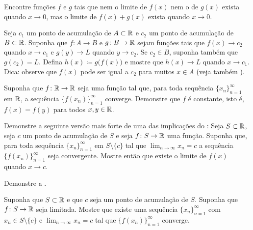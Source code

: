 \begin{exercise}
Encontre funções $f$ e $g$ tais que nem o limite de $f(x)$ nem o de $g(x)$ exista quando $x \to 0$, mas o limite de $f(x)+g(x)$ exista quando $x \to 0$.
\end{exercise}

\begin{exercise} \label{exercise:contlimitcomposition}
Seja $c_1$ um ponto de acumulação de $A \subset {\mathbb{R}}$ e $c_2$ um
ponto de acumulação de $B \subset {\mathbb{R}}$. Suponha que
$f \colon A \to B$ e $g \colon B \to {\mathbb{R}}$ sejam funções tais que
$f(x) \to c_2$ quando $x \to c_1$ e
$g(y) \to L$ quando $y \to c_2$. Se $c_2 \in B$, suponha também que $g(c_2) = L$.
Defina $h(x) \coloneqq g\bigl(f(x)\bigr)$ e mostre que
$h(x) \to L$ quando $x \to c_1$.
Dica: observe que $f(x)$ pode ser igual a $c_2$ para muitos $x \in A$
(veja também
).
\end{exercise}

\begin{exercise}
Suponha que $f \colon {\mathbb{R}} \to {\mathbb{R}}$ seja uma função tal que, para toda
sequência $\{x_n\}_{n=1}^\infty$ em ${\mathbb{R}}$, a sequência
$\bigl\{ f(x_n) \bigr\}_{n=1}^\infty$ converge. Demonstre que
$f$ é constante, isto é,
$f(x) = f(y)$ para todos $x,y \in {\mathbb{R}}$.
\end{exercise}

\begin{exercise} \label{exercise:seqflimitalt}
Demonstre a seguinte versão mais forte de uma das implicações do
:
Seja $S \subset {\mathbb{R}}$, seja $c$ um ponto de acumulação de $S$ e seja $f \colon S \to
{\mathbb{R}}$ uma função.
Suponha que, para toda sequência $\{x_n\}_{n=1}^\infty$ em $S \setminus \{c\}$ tal que
$\lim_{n\to\infty} x_n = c$ a sequência $\bigl\{ f(x_n) \bigr\}_{n=1}^\infty$ seja convergente.
Mostre então que existe o limite de $f(x)$ quando $x \to c$.
\end{exercise}

\begin{exercise}
Demonstre a .
\end{exercise}

\begin{exercise}
Suponha que $S \subset {\mathbb{R}}$ e que $c$ seja um ponto de acumulação de $S$.  Suponha que $f \colon
S \to {\mathbb{R}}$ seja limitada.  Mostre que existe uma sequência
$\{ x_n \}_{n=1}^\infty$
com $x_n \in S \setminus \{ c \}$ e $\lim_{n\to\infty} x_n = c$ tal que
$\bigl\{ f(x_n) \bigr\}_{n=1}^\infty$ converge.
\end{exercise}

